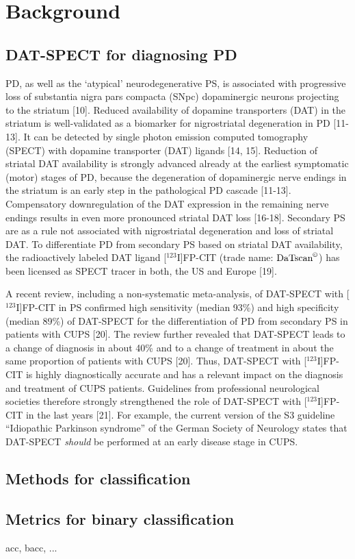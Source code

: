 \section{Background}
\label{sec:background}

\subsection{DAT-SPECT for diagnosing PD}
\label{subsec:datspect}


PD, as well as the `atypical' neurodegenerative PS, is associated with progressive loss of substantia nigra pars compacta (SNpc) dopaminergic neurons 
projecting to the striatum [10]. 
Reduced availability of dopamine transporters (DAT) in the striatum is well-validated as a biomarker for nigrostriatal degeneration in PD [11-13]. 
It can be detected by single photon emission computed tomography (SPECT) with dopamine transporter (DAT) ligands [14, 15]. 
Reduction of striatal DAT availability is strongly advanced already at the earliest symptomatic (motor) stages of PD, 
because the degeneration of dopaminergic nerve endings in the striatum is an early step in the pathological PD cascade [11-13]. 
Compensatory downregulation of the DAT expression in the remaining nerve endings results in even more pronounced striatal DAT loss [16-18]. 
Secondary PS are as a rule not associated with nigrostriatal degeneration and loss of striatal DAT. 
To differentiate PD from secondary PS based on striatal DAT availability, the radioactively labeled DAT ligand [$^{123}$I]FP-CIT 
(trade name: $\text{DaTscan}^{\copyright}$) has been licensed as SPECT tracer in both, the US and Europe [19].


A recent review, including a non-systematic meta-analysis, of DAT-SPECT with [$^{123}$I]FP-CIT in PS confirmed high sensitivity (median 93\%) 
and high specificity (median 89\%) of DAT-SPECT for the differentiation of PD from secondary PS in patients with CUPS [20]. 
The review further revealed that DAT-SPECT leads to a change of diagnosis in about 40\% and to a change of treatment in about the same proportion of 
patients with CUPS [20]. 
Thus, DAT-SPECT with [$^{123}$I]FP-CIT is highly diagnostically accurate and has a relevant impact on the diagnosis and treatment of CUPS patients. 
Guidelines from professional neurological societies therefore strongly strengthened the role of DAT-SPECT with [$^{123}$I]FP-CIT in the last years [21]. 
For example, the current version of the S3 guideline “Idiopathic Parkinson syndrome” of the German Society of Neurology states that DAT-SPECT 
\textit{should} be performed at an early disease stage in CUPS. 


\subsection{Methods for classification}
\label{subsec:randfors}



\subsection{Metrics for binary classification}
\label{subsec:metrics}


acc, bacc, ...